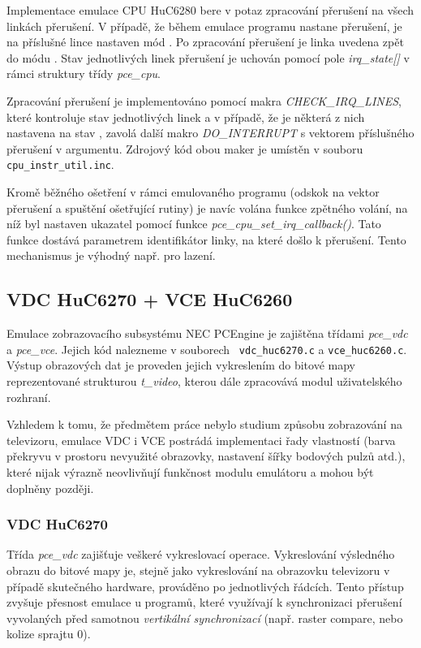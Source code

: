 Implementace emulace CPU HuC6280 bere v potaz zpracování přerušení na všech
linkách přerušení. V případě, že během emulace programu nastane přerušení, je
na příslušné lince nastaven mód . Po zpracování přerušení je linka
uvedena zpět do módu . Stav jednotlivých linek přerušení je uchován
pomocí pole {\it irq\_state[]} v rámci struktury třídy {\it pce\_cpu}.

Zpracování přerušení je implementováno pomocí makra {\it CHECK\_IRQ\_LINES},
které kontroluje stav jednotlivých linek a v případě, že je některá z nich
nastavena na stav , zavolá další makro {\it DO\_INTERRUPT} s
vektorem příslušného přerušení v argumentu. Zdrojový kód obou maker je
umístěn v souboru {\tt cpu\_instr\_util.inc}.

Kromě běžného ošetření v rámci emulovaného programu (odskok na vektor přerušení
a spuštění ošetřující rutiny) je navíc volána funkce zpětného volání, na níž
byl nastaven ukazatel pomocí funkce {\it pce\_cpu\_set\_irq\_callback()}. Tato
funkce dostává parametrem identifikátor linky, na které došlo k přerušení.
Tento mechanismus je výhodný např. pro lazení.

%
%

\subsection{VDC HuC6270 + VCE HuC6260}

Emulace zobrazovacího subsystému NEC PCEngine je zajištěna třídami {\it
pce\_vdc} a {\it pce\_vce}. Jejich kód nalezneme v souborech {\tt
vdc\_huc6270.c} a {\tt vce\_huc6260.c}. Výstup obrazových dat je proveden
jejich vykreslením do bitové mapy reprezentované strukturou {\it t\_video},
kterou dále zpracovává modul uživatelského rozhraní.

Vzhledem k tomu, že předmětem práce nebylo studium způsobu zobrazování na
televizoru, emulace VDC i VCE postrádá implementaci řady vlastností (barva
překryvu v prostoru nevyužité obrazovky, nastavení šířky bodových pulzů atd.),
které nijak výrazně neovlivňují funkčnost modulu emulátoru a mohou být doplněny
později.


\subsubsection{VDC HuC6270}

Třída {\it pce\_vdc} zajišťuje veškeré vykreslovací operace. Vykreslování
výsledného obrazu do bitové mapy je, stejně jako vykreslování na obrazovku
televizoru v případě skutečného hardware, prováděno po jednotlivých řádcích.
Tento přístup zvyšuje přesnost emulace u programů, které využívají k
synchronizaci přerušení vyvolaných před samotnou {\em vertikální synchronizací}
(např. raster compare, nebo kolize sprajtu 0).

